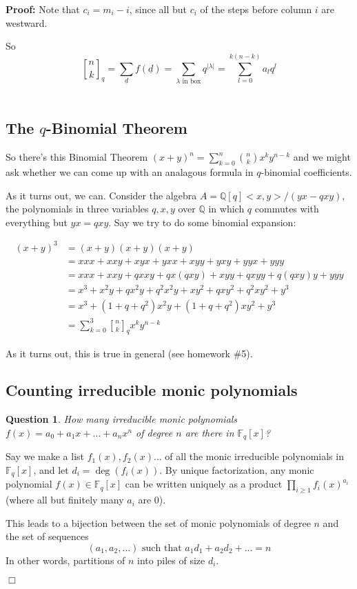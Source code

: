 \documentclass[11pt]{article}
\newtheorem{question}[theorem]{Question}
\newenvironment{proof}{\noindent \textbf{Proof:}}{$\Box$}
\newcommand{\F}{\mathbb F} %
\newcommand{\Q}{\mathbb Q} %
\newcommand{\qbinom}[2] {{#1 \brack #2}_q}
\newcommand{\und}[1]{\underline{#1}}
\begin{document}
\begin{proof}
Note that $c_i = m_i - i$, since all but $c_i$ of the steps before column $i$ are westward.

So $$\qbinom{n}{k} = \sum_{\und{d}} f(\und{d}) = \sum_{\lambda \text{ in box}} q^{|\lambda|} = \sum_{l=0}^{k(n-k)} a_l q^l$$\\


\subsection{The $q$-Binomial Theorem}
So there's this Binomial Theorem $\displaystyle (x+y)^n = \sum_{k=0}^n {{n \choose k} x^k y^{n-k}}$ and we might ask whether we can come up with an analagous formula in $q$-binomial coefficients.

As it turns out, we can. Consider the algebra $A = \Q[q]<x,y> / (yx-qxy)$, the polynomials in three variables $q,x,y$ over $\Q$ in which $q$ commutes with everything but $yx = qxy$. Say we try to do some binomial expansion:

\begin{align*}
(x+y)^3 &= (x+y)(x+y)(x+y)\\
&= xxx + xxy + xyx + yxx + xyy + yxy + yyx + yyy\\
&= xxx + xxy + qxxy + qx(qxy) + xyy + qxyy + q(qxy)y + yyy\\
&= x^3 + x^2y + qx^2y + q^2x^2y + xy^2 + qxy^2 + q^2xy^2 + y^3\\
&= x^3 + (1+q+q^2)x^2y + (1+q+q^2)xy^2 + y^3\\
&= \sum_{k=0}^3 \qbinom{n}{k} x^k y^{n-k}
\end{align*}

As it turns out, this is true in general (see homework \#5).

\subsection{Counting irreducible monic polynomials}
\begin{question}
How many irreducible monic polynomials $f(x) = a_0 + a_1 x + \ldots + a_n x^n$ of degree $n$ are there in $\F_q[x]$?
\end{question}
Say we make a list $f_1(x), f_2(x) \ldots$ of all the monic irreducible polynomials in $\F_q[x]$, and let $d_i = \deg(f_i(x))$. By unique factorization, any monic polynomial $f(x) \in \F_q[x]$ can be written uniquely as a product $\displaystyle\prod_{i\ge 1} f_i(x)^{a_i}$ (where all but finitely many $a_i$ are 0).

This leads to a bijection between the set of monic polynomials of degree $n$ and the set of sequences $$(a_1, a_2, \ldots) \text{ such that } a_1 d_1 + a_2 d_2 + \ldots = n$$
In other words, partitions of $n$ into piles of size $d_i$.


\end{proof}
\end{document}
